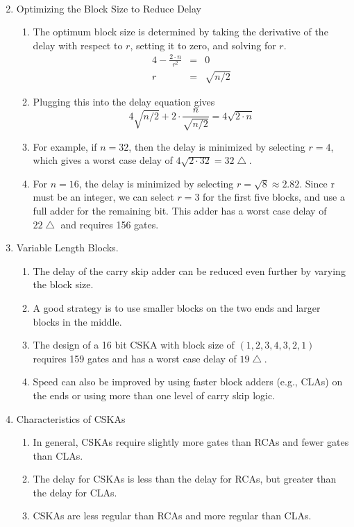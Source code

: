\documentclass[times, twocolumn, 10pt]{article}
\begin{document}
\begin{enumerate}
\begin{enumerate}
\begin{eqnarray*}
    \end{eqnarray*}
  \end{enumerate}
\item Optimizing the Block Size to Reduce Delay
  \begin{enumerate}
  \item The optimum block size is determined by taking the derivative
    of the delay with respect to $r$, setting it to zero, and 
    solving for $r$. 
    \begin{eqnarray*}
      4 - \frac{2 \cdot n}{r^{2}} & = & 0  \\
      r & = & \sqrt{n/2} 
    \end{eqnarray*}
  \item Plugging this into the delay equation gives 
    \begin{displaymath}
      4 \sqrt{n/2} + 2 \cdot \frac{n}{\sqrt{n/2}}  = 4 \sqrt{2 \cdot n}
    \end{displaymath}
  \item For example, if $n = 32$, then the delay is minimized by
    selecting $r = 4$, which gives a worst case delay of 
    $4 \sqrt{2 \cdot 32} = 32 \bigtriangleup$. 
  \item For $n = 16$, the delay is minimized by selecting 
    $r = \sqrt{8} \approx 2.82$. Since r must be an integer, 
    we can select $r = 3$ for the first five blocks, and use
    a full adder for the remaining bit. This adder has a worst
    case delay of $22 \bigtriangleup$ and requires 156 gates. 
  \end{enumerate}
\item Variable Length Blocks. 
  \begin{enumerate}
  \item The delay of the carry skip adder can be reduced even
    further by varying the block size. 
  \item A good strategy is to use smaller blocks on the two ends
    and larger blocks in the middle. 
  \item The design of a 16 bit CSKA with block size of $(1, 2, 3, 4, 3, 2, 1)$ 
    requires 159 gates and has a worst case delay of $19 \bigtriangleup$.
  \item Speed can also be improved by using faster block adders 
    (e.g., CLAs) on the ends or using more than one level 
    of carry skip logic.
  \end{enumerate}
\item Characteristics of CSKAs
  \begin{enumerate}
  \item In general, CSKAs require slightly more gates than RCAs and fewer
    gates than CLAs. 
  \item The delay for CSKAs is less than the delay for RCAs, but 
    greater than the delay for CLAs. 
  \item CSKAs are less regular than RCAs and more regular than CLAs. 


\end{enumerate}
\end{enumerate}
\end{document}
